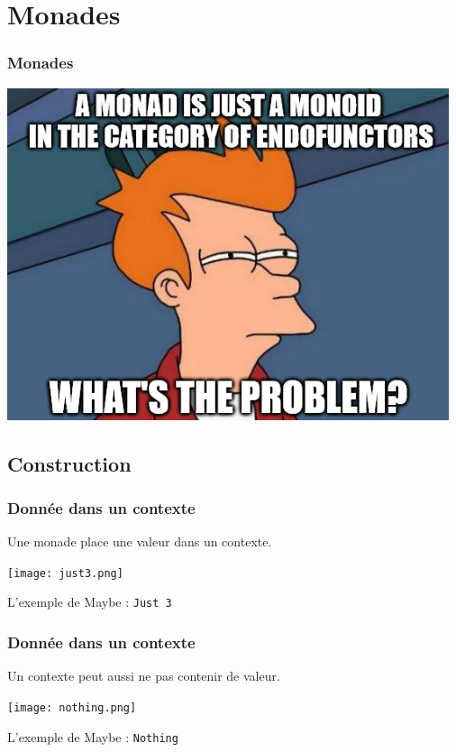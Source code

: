 \documentclass{beamer}
\begin{document}
\section{Monades}

\begin{frame}

\frametitle{Monades}
\begin{center}
\includegraphics[scale=0.5]{monad_meme.png}
\end{center}
\end{frame}

\subsection{Construction}
\begin{frame}
\frametitle{Donnée dans un contexte}

\begin{block}{}
Une monade place une valeur dans un contexte.
\end{block}

\begin{center}
\texttt{[image: just3.png]}
\end{center}

\begin{exampleblock}{}
L'exemple de Maybe : \verb!Just 3!
\end{exampleblock}
\end{frame}

\begin{frame}
\frametitle{Donnée dans un contexte}

\begin{block}{}
Un contexte peut aussi ne pas contenir de valeur.
\end{block}

\begin{center}
\texttt{[image: nothing.png]}
\end{center}
\begin{exampleblock}{}
L'exemple de Maybe : \verb!Nothing!
\end{exampleblock}
\end{frame}
\end{document}
